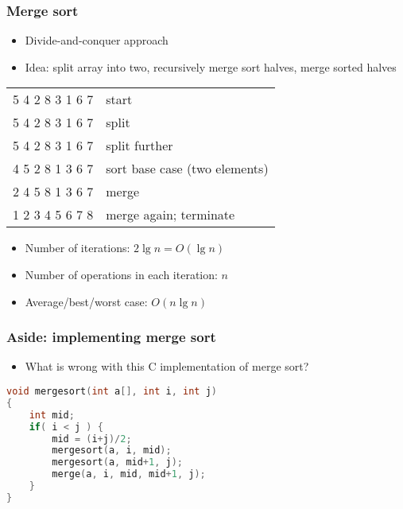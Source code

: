 \documentclass{beamer}
\begin{document}
\begin{frame}
 \frametitle{Merge sort}
 \begin{itemize}
  \item Divide-and-conquer approach
  \item Idea: split array into two, recursively merge sort halves, merge
        sorted halves
 \end{itemize}
 \begin{center}
 \begin{tabular}{cl}
  5 4 2 8 3 1 6 7 & start \pause \\
  5 4 2 8 \hspace{0.5cm}  3 1 6 7 & split \pause \\
  5 4 \hspace{0.5cm} 2 8 \hspace{0.5cm} 3 1 \hspace{0.5cm} 6 7 & split further \pause \\
  4 5 \hspace{0.5cm} 2 8 \hspace{0.5cm} 1 3 \hspace{0.5cm} 6 7 & sort base case (two elements) \pause \\
  2 4 5 8 \hspace{0.5cm} 1 3 6 7 & merge \pause \\
  1 2 3 4 5 6 7 8 & merge again; terminate \pause \\
 \end{tabular}
 \end{center}
 \begin{itemize}
  \item Number of iterations: $2 \lg n = O(\lg n)$
  \item Number of operations in each iteration: $n$
  \item Average/best/worst case: $O(n \lg n)$
 \end{itemize}
\end{frame}

\begin{frame}[fragile]
 \frametitle{Aside: implementing merge sort}
 \begin{itemize}
  \item What is wrong with this C implementation of merge sort?
 \end{itemize}
 \begin{lstlisting}[language=C]
void mergesort(int a[], int i, int j)
{
    int mid;
    if( i < j ) {
        mid = (i+j)/2;
        mergesort(a, i, mid);
        mergesort(a, mid+1, j);
        merge(a, i, mid, mid+1, j);
    }
}
 \end{lstlisting}
\end{frame}
\end{document}
